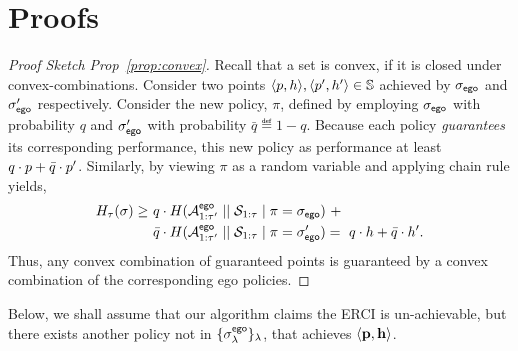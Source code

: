\section{Proofs}\label{sec:proofs}
\begin{proof}[Proof Sketch Prop~\ref{prop:convex}]
  Recall that a set is convex, if it is closed under
  convex-combinations\footnotemark. Consider two points
  $\langle p, h \rangle, \langle p', h' \rangle \in
  \mathbb{S}$ achieved by ${\sigma_{\mathsf{ego}}}$ and ${\sigma'_{\mathsf{ego}}}$
  respectively. Consider the new policy, $\pi$, defined by employing
  ${\sigma_{\mathsf{ego}}}$ with probability $q$ and ${\sigma'_{\mathsf{ego}}}$ with
  probability $\bar{q} \eqdef 1 - q$.  Because each policy
  \emph{guarantees} its corresponding performance, this new policy as
  performance at least $q\cdot p + \bar{q}\cdot p'$.  Similarly,
  by viewing $\pi$ as a random variable and applying chain rule
  yields,
  \begin{equation}
    \begin{split}
      H_\tau(\sigma)
      \geq &~q \cdot H( {\mathcal{A}}^{\mathsf{ego}}_{1:\tau'} \mid\mid {\mathcal{S}}_{1:\tau} \mid \pi={\sigma_{\mathsf{ego}}})~+\\
      &~\bar{q}  \cdot H( {\mathcal{A}}^{\mathsf{ego}}_{1:\tau'} \mid\mid {\mathcal{S}}_{1:\tau} \mid \pi={\sigma'_{\mathsf{ego}}})
      =~q\cdot h + \bar{q}\cdot h'.
    \end{split}
  \end{equation}
  Thus, any convex combination of guaranteed points is guaranteed by
  a convex combination of the corresponding ego policies.
\end{proof}


Below, we shall
assume that our algorithm claims the ERCI is un-achievable, but there
exists another policy not in $\{\sigma^{\mathsf{ego}}_\lambda\}_\lambda$, that
achieves $\langle \mathbf{p}, \mathbf{h} \rangle$.

